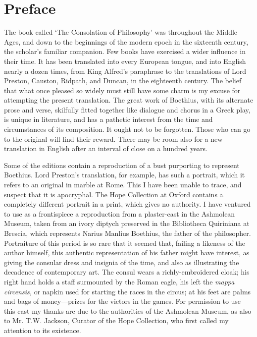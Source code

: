 \documentclass[12pt]{book}
\begin{document}
\chapter{Preface}

The book called `The Consolation of Philosophy' was throughout the
Middle Ages, and down to the beginnings of the modern epoch in the
sixteenth century, the scholar's familiar companion. Few books have
exercised a wider influence in their time. It has been translated into
every European tongue, and into English nearly a dozen times, from King
Alfred's paraphrase to the translations of Lord Preston, Causton,
Ridpath, and Duncan, in the eighteenth century. The belief that what
once pleased so widely must still have some charm is my excuse for
attempting the present translation. The great work of Boethius, with its
alternate prose and verse, skilfully fitted together like dialogue and
chorus in a Greek play, is unique in literature, and has a pathetic
interest from the time and circumstances of its composition. It ought
not to be forgotten. Those who can go to the original will find their
reward. There may be room also for a new translation in English after an
interval of close on a hundred years.

\label{diptych}
Some of the editions contain a reproduction of a bust purporting to
represent Boethius. Lord Preston's translation, for example, has such a
portrait, which it refers to an original in marble at Rome. This I have
been unable to trace, and suspect that it is apocryphal. The Hope
Collection at Oxford contains a completely different portrait in a
print, which gives no authority. I have ventured to use as a
frontispiece a reproduction from a plaster-cast in the Ashmolean Museum,
taken from an ivory diptych preserved in the Bibliotheca Quiriniana at
Brescia, which represents Narius Manlius Boethius, the father of the
philosopher. Portraiture of this period is so rare that it seemed that,
failing a likeness of the author himself, this authentic representation
of his father might have interest, as giving the consular dress and
insignia of the time, and also as illustrating the decadence of
contemporary art. The consul wears a richly-embroidered cloak; his right
hand holds a staff surmounted by the Roman eagle, his left the \emph{mappa
circensis,} or napkin used for starting the races in the circus; at his
feet are palms and bags of money---prizes for the victors in the games.
For permission to use this cast my thanks are due to the authorities of
the Ashmolean Museum, as also to Mr. T.W. Jackson, Curator of the Hope
Collection, who first called my attention to its existence.
\end{document}
